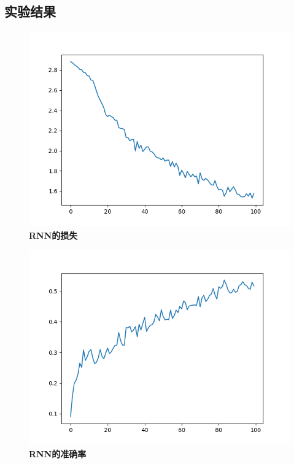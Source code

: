 \documentclass{article}
\begin{document}
\subsection{实验结果}
\begin{figure}[H]
   \centering
   \includegraphics[scale= 0.5]{validation_loss.png}
   \caption{\textbf{RNN的损失}}
\end{figure}
\begin{figure}[H]
   \centering
   \includegraphics[scale= 0.5]{validation_accuracy.png}
   \caption{\textbf{RNN的准确率}}
\end{figure}
\end{document}
